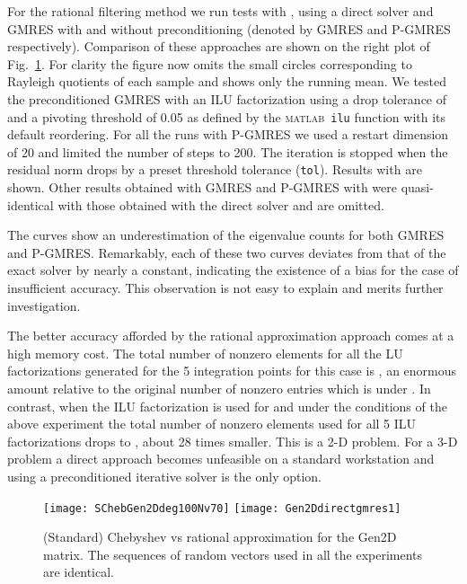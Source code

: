 \documentclass[12pt]{article}		\usepackage{tabls,multirow}
\def \MATLAB {\textsc{matlab}}
\begin{document}
For the rational filtering method we run tests with , using a
direct solver and GMRES with and without preconditioning (denoted by
GMRES and P-GMRES respectively). Comparison of these approaches are
shown on the right plot of Fig.~\ref{fig:Gen2D}.  For clarity the
figure now omits the small circles corresponding to Rayleigh quotients
of each sample and shows only the running mean. We tested the
preconditioned GMRES with an ILU factorization using a drop tolerance
of  and a pivoting threshold of 0.05 as
defined by the \MATLAB\ \texttt{ilu} function with its default
reordering. For all the runs with P-GMRES we used a restart dimension
of 20 and limited the number of steps to 200.  The iteration is
stopped when the residual norm drops by a preset threshold
tolerance (\texttt{tol}).  Results with  are
shown.  Other results obtained with GMRES and P-GMRES with
 were quasi-identical with those obtained with
the direct solver and are omitted.

The curves show an underestimation of the eigenvalue counts for both
GMRES and P-GMRES.  Remarkably, each of these two curves deviates from
that of the exact solver by nearly a constant, indicating the
existence of a bias for the case of insufficient accuracy. This
observation is not easy to explain and merits further investigation.

The better accuracy afforded by the rational approximation approach
comes at a high memory cost.  The total number of nonzero elements for
all the LU factorizations generated for the 5 integration points for
this case is , an enormous amount
relative to the original number of nonzero entries which is under
. In contrast, when the ILU factorization is used for  and under the conditions of the above experiment the total number
of nonzero elements used for all 5 ILU factorizations drops to
, about 28 times smaller. This is a 2-D
problem. For a 3-D problem a direct approach becomes unfeasible on a
standard workstation and using a preconditioned iterative solver is
the only option.

\begin{figure}[hbt]
\begin{center}
 \texttt{[image: SChebGen2Ddeg100Nv70]} 
 \texttt{[image: Gen2Ddirectgmres1]}
\end{center} 
 \caption{(Standard) Chebyshev vs rational approximation for 
 the Gen2D matrix. The sequences of 
 random vectors used in all the experiments are identical.
 \label{fig:Gen2D}}
 \end{figure}
\end{document}
